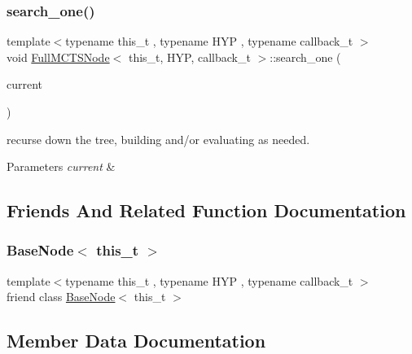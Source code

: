 \subsubsection{\texorpdfstring{search\+\_\+one()}{search\_one()}}
{\footnotesize\ttfamily template$<$typename this\+\_\+t , typename H\+YP , typename callback\+\_\+t $>$ \\
void \hyperlink{class_full_m_c_t_s_node}{Full\+M\+C\+T\+S\+Node}$<$ this\+\_\+t, H\+YP, callback\+\_\+t $>$\+::search\+\_\+one (\begin{DoxyParamCaption}\item[{H\+YP \&}]{current }\end{DoxyParamCaption})\hspace{0.3cm}{\ttfamily [inline]}}



recurse down the tree, building and/or evaluating as needed. 


\begin{DoxyParams}{Parameters}
{\em current} & \\
\hline
\end{DoxyParams}


\subsection{Friends And Related Function Documentation}
\mbox{\label{class_full_m_c_t_s_node_adf841553d0233d2421a8187d9226b7be}} 
\subsubsection{\texorpdfstring{Base\+Node$<$ this\+\_\+t $>$}{BaseNode< this\_t >}}
{\footnotesize\ttfamily template$<$typename this\+\_\+t , typename H\+YP , typename callback\+\_\+t $>$ \\
friend class \hyperlink{class_base_node}{Base\+Node}$<$ this\+\_\+t $>$\hspace{0.3cm}{\ttfamily [friend]}}



\subsection{Member Data Documentation}
\mbox{\label{class_full_m_c_t_s_node_a9bba77400c22c878cb3f015f8ad97613}} 
